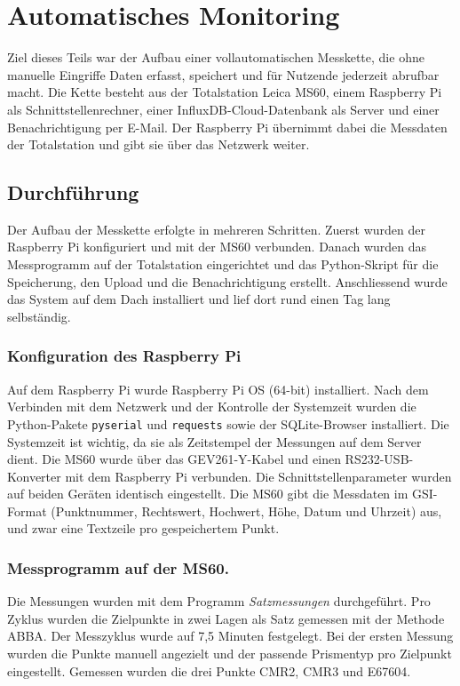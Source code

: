 \section{Automatisches Monitoring}
\label{sec:Automatisches Monitoring}

Ziel dieses Teils war der Aufbau einer vollautomatischen Messkette, die ohne manuelle Eingriffe Daten erfasst,
speichert und für Nutzende jederzeit abrufbar macht. Die Kette besteht aus der Totalstation Leica MS60, einem
Raspberry Pi als Schnittstellenrechner, einer InfluxDB-Cloud-Datenbank als Server und einer Benachrichtigung
per E-Mail. Der Raspberry Pi übernimmt dabei die Messdaten der Totalstation und gibt sie über das Netzwerk weiter.

\subsection{Durchführung}
\label{sec:Durchführung}
Der Aufbau der Messkette erfolgte in mehreren Schritten. Zuerst wurden der Raspberry Pi konfiguriert und mit der
MS60 verbunden. Danach wurden das Messprogramm auf der Totalstation eingerichtet und das Python-Skript für die
Speicherung, den Upload und die Benachrichtigung erstellt. Anschliessend wurde das System auf dem Dach installiert
und lief dort rund einen Tag lang selbständig.

\subsubsection{Konfiguration des Raspberry Pi}
Auf dem Raspberry Pi wurde Raspberry Pi OS (64-bit) installiert. Nach dem Verbinden mit dem Netzwerk und der
Kontrolle der Systemzeit wurden die Python-Pakete \texttt{pyserial} und \texttt{requests} sowie der SQLite-Browser
installiert. Die Systemzeit ist wichtig, da sie als Zeitstempel der Messungen auf dem Server dient.
Die MS60 wurde über das GEV261-Y-Kabel und einen RS232-USB-Konverter mit dem Raspberry Pi verbunden. Die
Schnittstellenparameter wurden auf beiden Geräten identisch eingestellt. Die MS60 gibt die Messdaten im GSI-Format
(Punktnummer, Rechtswert, Hochwert, Höhe, Datum und Uhrzeit) aus, und zwar eine Textzeile pro gespeichertem Punkt.

\subsubsection{Messprogramm auf der MS60.}
Die Messungen wurden mit dem Programm \textit{Satzmessungen} durchgeführt. Pro Zyklus wurden die Zielpunkte in zwei
Lagen als Satz gemessen mit der Methode ABBA. Der Messzyklus wurde auf 7,5 Minuten festgelegt. Bei der ersten Messung wurden die
Punkte manuell angezielt und der passende Prismentyp pro Zielpunkt eingestellt. Gemessen wurden die drei Punkte
CMR2, CMR3 und E67604.

